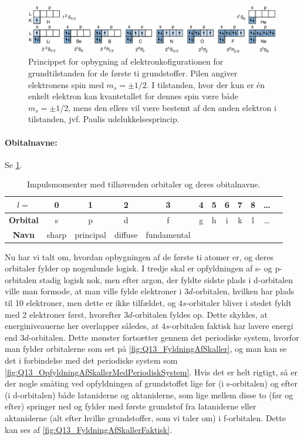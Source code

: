 \begin{figure}[!h]
    \centering
    \includegraphics[width=\textwidth]{Q13/images/FirstTwoShellsElectronicSpinConfiguration.PNG}
    \caption{Princippet for opbygning af elektronkofigurationen for grundtilstanden for de første ti grundstoffer. Pilen angiver elektronens spin med $m_s = \pm 1/2$. I tilstanden, hvor der kun er én enkelt elektron kan kvantetallet for dennes spin være både $m_s = \pm 1/2$, mens den ellers vil være bestemt af den anden elektron i tilstanden, jvf. Paulis udelukkelsesprincip.}
    \label{fig:Q13_FyldningAfDeInderstseToSkaller}
\end{figure}

\paragraph{Obitalnavne:} Se \cref{tab:Q13_ImpulsmomenterOrbitalerOgDeresNavne}.
\begin{table}[!h]
    \centering
    \begin{tabular}{|c|c|c|c|c|c|c|c|c|c|c|c|}
        \hline
        $l=$ & 0 & 1 & 2 & 3 & 4 & 5 & 6 & 7 & 8 & \ldots\\
        \hline
        \textbf{Orbital} & s & p & d & f & g & h & i & k & l & \ldots \\
        \hline
        \textbf{Navn} & sharp & principal & diffuse & fundamental & & & & & &\\
        \hline
    \end{tabular}
    \caption{Impulsmomenter med tilhørenden orbitaler og deres obitalnavne.}
    \label{tab:Q13_ImpulsmomenterOrbitalerOgDeresNavne}
\end{table}

Nu har vi talt om, hvordan opbygningen af de første ti atomer er, og deres orbitaler fylder op nogenlunde logisk. I tredje skal er opfyldningen af s- og p-orbitalen stadig logisk nok, men efter argon, der fyldte sidste plads i d-orbitalen ville man formode, at man ville fylde elektroner i $3d$-orbitalen, hvilken har plads til 10 elektroner, men dette er ikke tilfældet, og $4s$-orbitaler bliver i stedet fyldt med 2 elektroner først, hvorefter $3d$-orbitalen fyldes op. Dette skyldes, at energiniveauerne her overlapper således, at $4s$-orbitalen faktisk har lavere energi end $3d$-orbitalen. Dette mønster fortsætter gennem det periodiske system, hvorfor man fylder orbitalerne som set på \cref{fig:Q13_FyldningAfSkaller}, og man kan se det i forbindelse med det periodiske system som \cref{fig:Q13_OpfyldningAfSkallerMedPeriodiskSystem}.
\noindent
Hvis det er helt rigtigt, så er der nogle småting ved opfyldningen af grundstoffet lige før (i s-orbitalen) og efter (i d-orbitalen) både lataniderne og aktaniderne, som lige mellem disse to (før og efter) springer ned og fylder med første grundstof fra lataniderne eller aktaniderne (alt efter hvilke grundstoffer, som vi taler om) i f-orbitalen. Dette kan ses af \cref{fig:Q13_FyldningAfSkallerFaktisk}.


